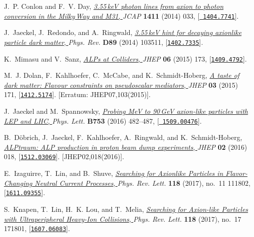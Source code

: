 \documentclass[11pt,a4paper]{article}
\begin{document}
\begin{thebibliography}{10}
J.~P. Conlon and F.~V. Day,
  \href{http://dx.doi.org/10.1088/1475-7516/2014/11/033}{{\it {3.55\,keV photon
  lines from axion to photon conversion in the Milky\,Way and M31}}, } {\em
  JCAP} {\bf 1411} (2014) 033, [\href{http://arxiv.org/abs/1404.7741}{{\tt
  1404.7741}}].

J.~Jaeckel, J.~Redondo, and A.~Ringwald,
  \href{http://dx.doi.org/10.1103/PhysRevD.89.103511}{{\it {3.55\,keV hint for
  decaying axionlike particle dark matter}}, } {\em Phys. Rev.} {\bf D89}
  (2014) 103511, [\href{http://arxiv.org/abs/1402.7335}{{\tt 1402.7335}}].

K.~Mimasu and V.~Sanz, \href{http://dx.doi.org/10.1007/JHEP06(2015)173}{{\it
  {ALPs at Colliders}}, } {\em JHEP} {\bf 06} (2015) 173,
  [\href{http://arxiv.org/abs/1409.4792}{{\tt 1409.4792}}].

M.~J. Dolan, F.~Kahlhoefer, C.~McCabe, and K.~Schmidt-Hoberg,
  \href{http://dx.doi.org/10.1007/JHEP07(2015)103,
  10.1007/JHEP03(2015)171}{{\it {A taste of dark matter: Flavour constraints on
  pseudoscalar mediators}}, } {\em JHEP} {\bf 03} (2015) 171,
  [\href{http://arxiv.org/abs/1412.5174}{{\tt 1412.5174}}]. [Erratum:
  JHEP07,103(2015)].

J.~Jaeckel and M.~Spannowsky,
  \href{http://dx.doi.org/10.1016/j.physletb.2015.12.037}{{\it {Probing MeV to
  90\,GeV axion-like particles with LEP and LHC}}, } {\em Phys. Lett.} {\bf
  B753} (2016) 482--487, [\href{http://arxiv.org/abs/1509.00476}{{\tt
  1509.00476}}].

B.~D{\"o}brich, J.~Jaeckel, F.~Kahlhoefer, A.~Ringwald, and K.~Schmidt-Hoberg,
  \href{http://dx.doi.org/10.1007/JHEP02(2016)018}{{\it {ALPtraum: ALP
  production in proton beam dump experiments}}, } {\em JHEP} {\bf 02} (2016)
  018, [\href{http://arxiv.org/abs/1512.03069}{{\tt 1512.03069}}].
  [JHEP02,018(2016)].

E.~Izaguirre, T.~Lin, and B.~Shuve,
  \href{http://dx.doi.org/10.1103/PhysRevLett.118.111802}{{\it {Searching for
  Axionlike Particles in Flavor-Changing Neutral Current Processes}}, } {\em
  Phys. Rev. Lett.} {\bf 118} (2017), no.~11 111802,
  [\href{http://arxiv.org/abs/1611.09355}{{\tt 1611.09355}}].

S.~Knapen, T.~Lin, H.~K. Lou, and T.~Melia,
  \href{http://dx.doi.org/10.1103/PhysRevLett.118.171801}{{\it {Searching for
  Axion-like Particles with Ultraperipheral Heavy-Ion Collisions}}, } {\em
  Phys. Rev. Lett.} {\bf 118} (2017), no.~17 171801,
  [\href{http://arxiv.org/abs/1607.06083}{{\tt 1607.06083}}].


\end{thebibliography}
\end{document}
